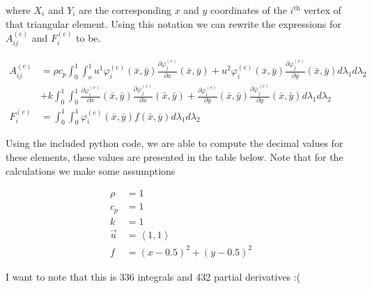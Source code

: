 \documentclass[9pt]{amsart}
\newcommand{\e}[2]{_{#1}^{(#2)}}
\newcommand{\pder}[2]{\frac{\partial #1}{\partial #2}}
\begin{document}
where $X_i$ and $Y_i$ are the corresponding $x$ and $y$ coordinates of the
$i^\text{th}$ vertex of that triangular element. Using this notation we can
rewrite the expressions for $A\e{ij}{e}$ and $F\e{i}{e}$ to be.

\begin{align*}
  A\e{ij}{e}
  &=\rho c_p
  \int_0^1\int_o^1u^1\varphi\e{i}{e}(\bar{x},\bar{y})\pder{\varphi\e{j}{e}}{x}(\bar{x},\bar{y})+u^2\varphi\e{i}{e}(\bar{x},\bar{y})\pder{\varphi\e{j}{e}}{y}(\bar{x},\bar{y})d\lambda_1d\lambda_2
  \\
  &+k\int_0^1\int_0^1\pder{\varphi\e{i}{e}}{x}(\bar{x},\bar{y})\pder{\varphi\e{j}{e}}{x}(\bar{x},\bar{y})+
  \pder{\varphi\e{i}{e}}{y}(\bar{x},\bar{y})\pder{\varphi\e{j}{e}}{y}(\bar{x},\bar{y})d\lambda_1d\lambda_2\\
  F\e{i}{e}&=\int_0^1\int_0^1\varphi\e{i}{e}(\bar{x},\bar{y})f(\bar{x},\bar{y})d\lambda_1d\lambda_2
\end{align*}

Using the included python code, we are able to compute the decimal values for
these elements, these values are presented in the table below. Note that for
the calculations we make some assumptions

\begin{align*}
  \rho &= 1\\
  c_p &= 1\\
  k &= 1\\
  \vec{u} &=\left<1,1\right>\\
  f &= (x-0.5)^2+(y-0.5)^2
\end{align*}

I want to note that this is 336 integrals and 432 partial derivatives :(
\end{document}
